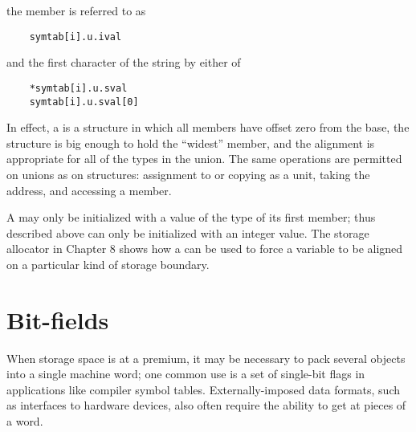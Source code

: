 the member  is referred to as
\begin{lstlisting}
	symtab[i].u.ival
\end{lstlisting}
and the first character of the string  by either of
\begin{lstlisting}
	*symtab[i].u.sval
	symtab[i].u.sval[0]
\end{lstlisting}
In effect, a  is a structure in which all members have offset zero from the base, the structure is big enough to hold the ``widest'' member, and the alignment is appropriate for all of the types in the union.
The same operations are permitted on unions as on structures: assignment to or copying as a unit, taking the address, and accessing a member.

A  may only be initialized with a value of the type of its first member; thus  described above can only be initialized with an integer value.
The storage allocator in Chapter 8 shows how a  can be used to force a variable to be aligned on a particular kind of storage boundary.



\section{Bit-fields}


When storage space is at a premium, it may be necessary to pack several objects into a single machine word; one common use is a set of single-bit flags in applications like compiler symbol tables.
Externally-imposed data formats, such as interfaces to hardware devices, also often require the ability to get at pieces of a word.

